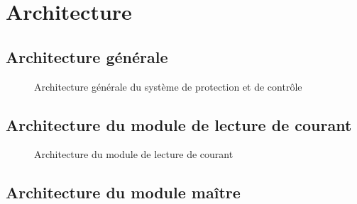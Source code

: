 \section{Architecture}

	\subsection{Architecture générale}
		\begin{figure}[H]
			\centering
			\caption{Architecture générale du système de protection et de contrôle}
			\label{fig:architecture_generale}
		\end{figure}

	\subsection{Architecture du module de lecture de courant}
		\begin{figure}[H]
			\centering
			\caption{Architecture du module de lecture de courant}
			\label{fig:architecturelecturecourant}
		\end{figure}
	\subsection{Architecture du module maître}

